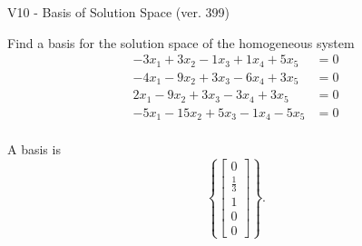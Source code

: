 \begin{exercise}
  \begin{exerciseTitle}V10 - Basis of Solution Space (ver. 399)\end{exerciseTitle}
  \begin{exerciseStatement}
    Find a basis for the solution space of the homogeneous system 
\begin{align*}
 -3 x_ 1 + 3 x_ 2 -1 x_ 3 + 1 x_ 4 + 5 x_ 5 &= 0  \\ 
  -4 x_ 1 -9 x_ 2 + 3 x_ 3 -6 x_ 4 + 3 x_ 5 &= 0  \\ 
  2 x_ 1 -9 x_ 2 + 3 x_ 3 -3 x_ 4 + 3 x_ 5 &= 0  \\ 
  -5 x_ 1 -15 x_ 2 + 5 x_ 3 -1 x_ 4 -5 x_ 5 &= 0  \\ 
 \end{align*}


 
  \end{exerciseStatement}

  \begin{exerciseAnswer}
   A basis is   
\[\left\{\left[\begin{array}{c}
0 \\
\frac{1}{3} \\
1 \\
0 \\
0
\end{array}\right]\right\}.\]

  


  \end{exerciseAnswer}
\end{exercise}